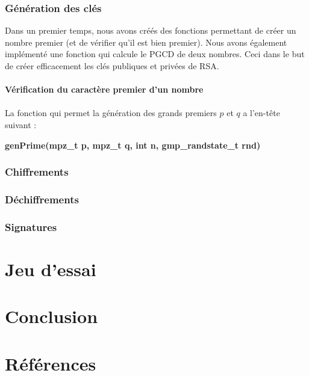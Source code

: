 \documentclass[12pt]{article}
\theoremstyle{definition}\newtheorem{defn}{Définition}
\theoremstyle{definition}\newtheorem{exm}{Exemple}
\theoremstyle{definition}\newtheorem{rem}{Remarque}
\theoremstyle{definition}\newtheorem{algo}{Algorithme}
\theoremstyle{remark}\newtheorem{exo}{Exercice}
\theoremstyle{remark}\newtheorem{nota}{Notation}
\begin{document}
\subsubsection{Génération des clés}
Dans un premier temps, nous avons créés des fonctions permettant de créer un nombre premier (et de vérifier qu'il est bien premier). Nous avons également implémenté une fonction qui calcule le PGCD de deux nombres. Ceci dans le but de créer efficacement les clés publiques et privées de RSA.\\\\
\textbf{Vérification du caractère premier d'un nombre}\\\\
La fonction qui permet la génération des grands premiers $p$ et $q$ a l'en-tête suivant :
\begin{center}
\textbf{genPrime(mpz\_t p, mpz\_t q, int n, gmp\_randstate\_t rnd)}
\end{center}

\subsubsection{Chiffrements}

\subsubsection{Déchiffrements}

\subsubsection{Signatures}



\pagebreak
\section{Jeu d'essai}

\pagebreak
\section*{Conclusion}

\pagebreak
\section*{Références}

\end{document}
